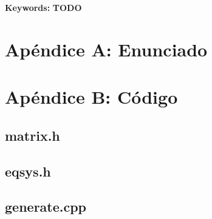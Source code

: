 \documentclass[10pt,a4paper]{article}
\begin{document}
\textbf{Keywords:} \textbf{TODO}

\newpage
\tableofcontents
\newpage



\newpage

\newpage

\newpage

\newpage

\section{Apéndice A: Enunciado}

\pagebreak
\section{Apéndice B: Código}
\subsection{matrix.h}

\subsection{eqsys.h}

\subsection{generate.cpp}

\end{document}
